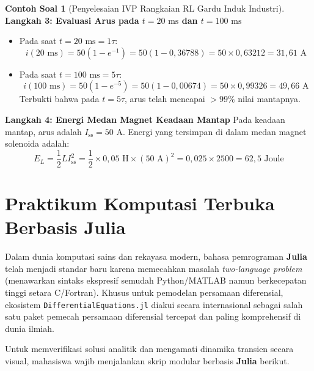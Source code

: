 \documentclass[11pt,a4paper]{article}
\theoremstyle{definition}
\newtheorem{example}{Contoh Soal}[section]
\begin{document}
\begin{example}[Penyelesaian IVP Rangkaian RL Gardu Induk Industri]
\textbf{Langkah 3: Evaluasi Arus pada $t = 20\text{ ms}$ dan $t = 100\text{ ms}$}
\begin{itemize}
    \item Pada saat $t = 20\text{ ms} = 1\tau$:
    \begin{equation}
        i(20\text{ ms}) = 50 (1 - e^{-1}) = 50 (1 - 0{,}36788) = 50 \times 0{,}63212 = 31{,}61\text{ A}
    \end{equation}
    \item Pada saat $t = 100\text{ ms} = 5\tau$:
    \begin{equation}
        i(100\text{ ms}) = 50 (1 - e^{-5}) = 50 (1 - 0{,}00674) = 50 \times 0{,}99326 = 49{,}66\text{ A}
    \end{equation}
    Terbukti bahwa pada $t = 5\tau$, arus telah mencapai $>99\%$ nilai mantapnya.
\end{itemize}

\textbf{Langkah 4: Energi Medan Magnet Keadaan Mantap}
Pada keadaan mantap, arus adalah $I_{\text{ss}} = 50\text{ A}$. Energi yang tersimpan di dalam medan magnet solenoida adalah:
\begin{equation}
    E_L = \frac{1}{2} L I_{\text{ss}}^2 = \frac{1}{2} \times 0{,}05\text{ H} \times (50\text{ A})^2 = 0{,}025 \times 2500 = 62{,}5\text{ Joule}
\end{equation}
\end{example}


\section{Praktikum Komputasi Terbuka Berbasis Julia}

Dalam dunia komputasi sains dan rekayasa modern, bahasa pemrograman \textbf{Julia} telah menjadi standar baru karena memecahkan masalah \textit{two-language problem} (menawarkan sintaks ekspresif semudah Python/MATLAB namun berkecepatan tinggi setara C/Fortran). Khusus untuk pemodelan persamaan diferensial, ekosistem \texttt{DifferentialEquations.jl} diakui secara internasional sebagai salah satu paket pemecah persamaan diferensial tercepat dan paling komprehensif di dunia ilmiah.

Untuk memverifikasi solusi analitik dan mengamati dinamika transien secara visual, mahasiswa wajib menjalankan skrip modular berbasis \textbf{Julia} berikut.
\end{document}

